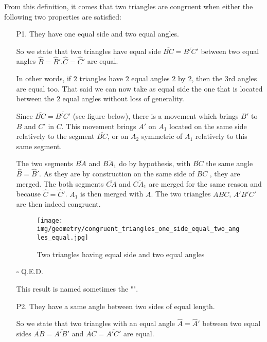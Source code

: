 	From this definition, it comes that two triangles are congruent when either the following two properties are satisfied:
	\begin{enumerate}
		\item[P1.] They have one equal side and two equal angles.
		\begin{dem}
		So we state that two triangles have equal side $\overline{BC} = \overline{B'C'}$ between two equal angles $\hat{B}=\hat{B}'$,$\hat{C}=\hat{C}'$ are equal.
		
		In other words, if $2$ triangles have $2$ equal angles $2$ by $2$, then the $3$rd angles are equal too. That said we can now take as equal side the one that is located between the $2$ equal angles without loss of generality.

	Since $\overline{BC} = \overline{B'C'}$ (see figure below), there is a movement which brings $B'$ to $B$ and $C'$ in $C$. This movement brings $A'$ on $A_1$ located on the same side relatively to the segment $\overline{BC}$, or on $A_2$ symmetric of $A_1$ relatively to this same segment.

	The two segments $\overline{BA}$ and  $\overline{BA_1}$ do by hypothesis, with  $\overline{BC}$  the same angle $\hat{B}=\hat{B}'$. As they are by construction on the same side of  $\overline{BC}$ , they are merged. The both segments  $\overline{CA}$ and $\overline{CA_1}$  are merged for the same reason and because  $\hat{C}=\hat{C}'$. $A_1$ is then merged with $A$. The two triangles $ABC$, $A'B'C'$ are then indeed congruent.
		\begin{figure}[H]
			\centering
			\texttt{[image: img/geometry/congruent\_triangles\_one\_side\_equal\_two\_angles\_equal.jpg]}
			\caption{Two triangles having equal side and two equal angles}
		\end{figure}
		\begin{flushright}
			$\square$  Q.E.D.
		\end{flushright}
		\end{dem}
		This result is named sometimes the "\index{angle-side-angle theorem}".

		\item[P2.] They have a same angle between two sides of equal length.
		\begin{dem}
		So we state that two triangles with an equal angle $\hat{A}=\hat{A}'$ between two equal sides $\overline{AB} = \overline{A'B '}$ and $\overline{AC}= \overline{A'C'}$ are equal.
		

\end{dem}
\end{enumerate}
